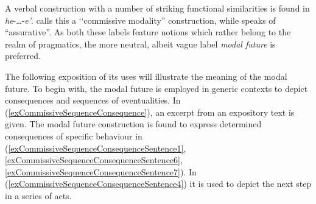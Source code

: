 A verbal construction with a number of striking functional similarities is found in  \textit{he}-…-\textit{e'}. \citet{LehmannC2012} calls this a \lq\lq commissive modality'' construction, while \citet{BohnemeyerJ2002} speaks of ``assurative''. As both these labels feature notions which rather belong to the realm of pragmatics, the more neutral, albeit vague label \textit{modal future} is preferred.

The following exposition of its uses will illustrate the meaning of the modal future. To begin with, the modal future is employed in generic contexts to depict consequences and sequences of eventualities. In (\ref{exCommissiveSequenceConsequence}), an excerpt from an expository text is given. The modal future construction is found to express determined consequences of specific behaviour in (\ref{exCommissiveSequenceConsequenceSentence1}, \ref{exCommissiveSequenceConsequenceSentence6}, \ref{exCommissiveSequenceConsequenceSentence7}). In (\ref{exCommissiveSequenceConsequenceSentence4}) it is used to depict the next step in a series of acts.

